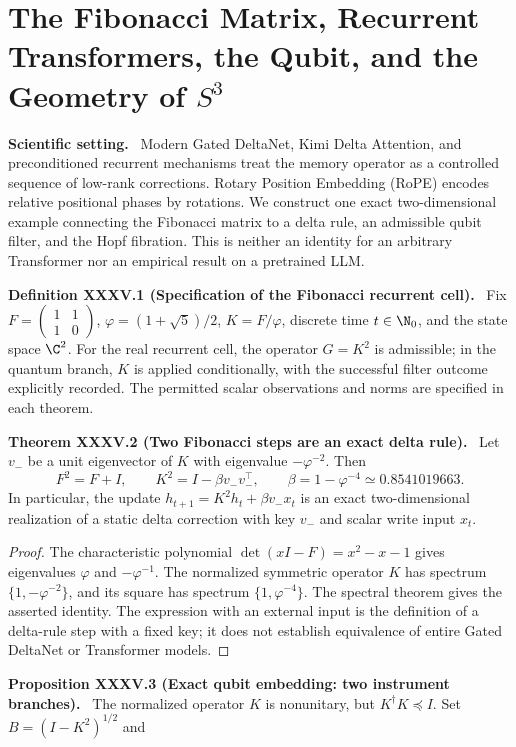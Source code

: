 \documentclass[11pt,a4paper,oneside]{book}
\newcommand{\statement}[3]{\par\medskip\noindent\textbf{#1 #2 (#3).}\ }
\newcommand{\note}[1]{\par\medskip\noindent\textbf{#1}\ }
\begin{document}
\chapter{The Fibonacci Matrix, Recurrent Transformers, the Qubit, and the Geometry of $S^3$}
\note{Scientific setting.} Modern Gated DeltaNet, Kimi Delta Attention, and preconditioned recurrent mechanisms treat the memory operator as a controlled sequence of low-rank corrections. Rotary Position Embedding (RoPE) encodes relative positional phases by rotations. We construct one exact two-dimensional example connecting the Fibonacci matrix to a delta rule, an admissible qubit filter, and the Hopf fibration. This is neither an identity for an arbitrary Transformer nor an empirical result on a pretrained LLM.
\statement{Definition}{XXXV.1}{Specification of the Fibonacci recurrent cell}
Fix $F=\left(\begin{smallmatrix}1&1\\1&0\end{smallmatrix}\right)$, $\varphi=(1+\sqrt5)/2$, $K=F/\varphi$, discrete time $t\in\N_0$, and the state space $\C^2$. For the real recurrent cell, the operator $G=K^2$ is admissible; in the quantum branch, $K$ is applied conditionally, with the successful filter outcome explicitly recorded. The permitted scalar observations and norms are specified in each theorem.
\statement{Theorem}{XXXV.2}{Two Fibonacci steps are an exact delta rule}
Let $v_-$ be a unit eigenvector of $K$ with eigenvalue $-\varphi^{-2}$. Then
\begin{equation}F^2=F+I,\qquad K^2=I-\beta v_-v_-^\top,\qquad \beta=1-\varphi^{-4}\simeq0.8541019663.\tag{122}\end{equation}
In particular, the update $h_{t+1}=K^2h_t+\beta v_-x_t$ is an exact two-dimensional realization of a static delta correction with key $v_-$ and scalar write input $x_t$.
\begin{proof}
The characteristic polynomial $\det(xI-F)=x^2-x-1$ gives eigenvalues $\varphi$ and $-\varphi^{-1}$. The normalized symmetric operator $K$ has spectrum $\{1,-\varphi^{-2}\}$, and its square has spectrum $\{1,\varphi^{-4}\}$. The spectral theorem gives the asserted identity. The expression with an external input is the definition of a delta-rule step with a fixed key; it does not establish equivalence of entire Gated DeltaNet or Transformer models.
\end{proof}
\statement{Proposition}{XXXV.3}{Exact qubit embedding: two instrument branches}
The normalized operator $K$ is nonunitary, but $K^\dagger K\preceq I$. Set $B=(I-K^2)^{1/2}$ and
\end{document}

